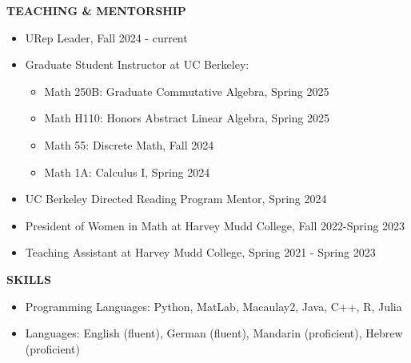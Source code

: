\documentclass[11pt]{article}
\newcommand{\hdr}[1]{\textcolor{blue(ryb)}{\textbf{#1}}}
\begin{document}
\hdr{TEACHING \& MENTORSHIP}\\
\begin{itemize}
\item URep Leader, Fall 2024 - current
\item Graduate Student Instructor at UC Berkeley:
  \begin{itemize}
  \item Math 250B: Graduate Commutative Algebra, Spring 2025
  \item Math H110: Honors Abstract Linear Algebra, Spring 2025
  \item Math 55: Discrete Math, Fall 2024
  \item Math 1A: Calculus I, Spring 2024
  \end{itemize}
\item UC Berkeley Directed Reading Program Mentor, Spring 2024
\item President of Women in Math at Harvey Mudd College, Fall 2022-Spring 2023
\item Teaching Assistant at Harvey Mudd College, Spring 2021 - Spring 2023
\end{itemize}

\bigskip

\hdr{SKILLS}\\
\begin{itemize}
\item 
Programming Languages: Python, MatLab, Macaulay2, Java, C++, R, Julia\\
\item 
Languages: English (fluent), German (fluent), Mandarin (proficient), Hebrew (proficient)
\end{itemize}
\end{document}
